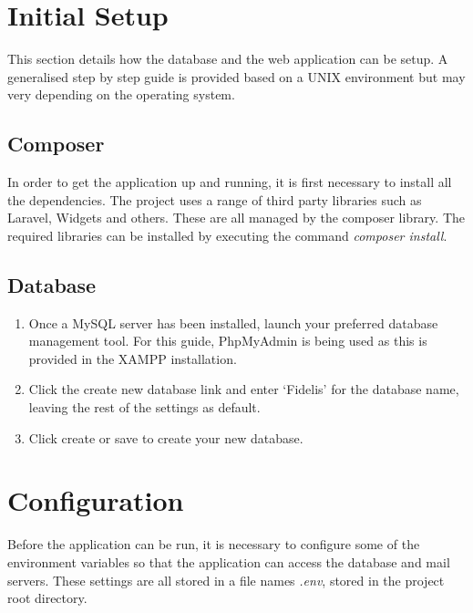 \documentclass[12pt]{article}
\begin{document}
\section{Initial Setup}
This section details how the database and the web application can be setup. A generalised step by step guide is provided based on a UNIX environment but may very depending on the operating system.

\subsection{Composer}
In order to get the application up and running, it is first necessary to install all the dependencies. The project uses a range of third party libraries such as Laravel, Widgets and others. These are all managed by the composer library. The required libraries can be installed by executing the command \textit{composer install}.

\subsection{Database}
\begin{enumerate}
	\item Once a MySQL server has been installed, launch your preferred  database management tool. For this guide, PhpMyAdmin is being used as this is provided in the XAMPP installation.
	\item Click the create new database link and enter `Fidelis' for the database name, leaving the rest of the settings as default.
	\item Click create or save to create your new database.
\end{enumerate}

\section{Configuration}
Before the application can be run, it is necessary to configure some of the environment variables so that the application can access the database and mail servers. These settings are all stored in a file names \emph{.env}, stored in the project root directory.
\end{document}
